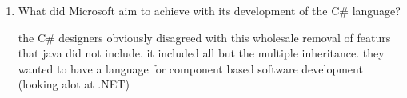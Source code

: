 \begin{enumerate}
\begin{answer}
    \end{answer}

  \item What did Microsoft aim to achieve with its development of the
    C\# language?

  \begin{answer}

   the C\# designers obviously disagreed with this wholesale removal of
   featurs that java did not include. it included all but the multiple
   inheritance. they wanted to have a language for component based
   software development (looking alot at .NET)


    \end{answer}

  \end{enumerate}


